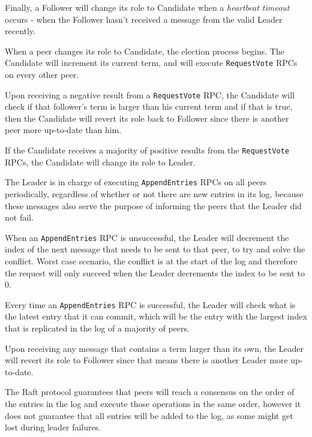 Finally, a Follower will change its role to Candidate when a \textit{heartbeat timeout} occurs - when the Follower hasn’t received a message from the valid Leader recently.

\vspace{0.5cm}

When a peer changes its role to Candidate, the election process begins. The Candidate will increment its current term, and will execute \texttt{RequestVote} RPCs on every other peer.

Upon receiving a negative result from a \texttt{RequestVote} RPC, the Candidate will check if that follower’s term is larger than his current term and if that is true, then the Candidate will revert its role back to Follower since there is another peer more up-to-date than him.

If the Candidate receives a majority of positive results from the \texttt{RequestVote} RPCs, the Candidate will change its role to Leader.

\vspace{0.5cm}

The Leader is in charge of executing \texttt{AppendEntries} RPCs on all peers periodically, regardless of whether or not there are new entries in its log, because these messages also serve the purpose of informing the peers that the Leader did not fail.

When an \texttt{AppendEntries} RPC is unsuccessful, the Leader will decrement the index of the next message that needs to be sent to that peer, to try and solve the conflict. Worst case scenario, the conflict is at the start of the log and therefore the request will only succeed when the Leader decrements the index to be sent to 0.

Every time an \texttt{AppendEntries} RPC is successful, the Leader will check what is the latest entry that it can commit, which will be the entry with the largest index that is replicated in the log of a majority of peers.

Upon receiving any message that contains a term larger than its own, the Leader will revert its role to Follower since that means there is another Leader more up-to-date.

\vspace{0.5cm}

The Raft protocol guarantees that peers will reach a consensus on the order of the entries in the log and execute those operations in the same order, however it does not guarantee that all entries will be added to the log, as some might get lost during leader failures.



